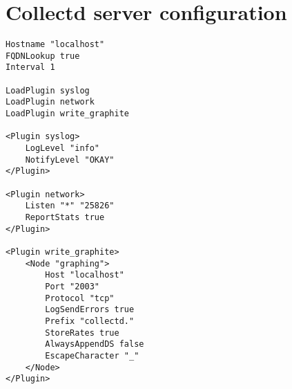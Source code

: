 \section{Collectd server configuration}\label{ANX:collectdFiles2}

\begin{verbatim}
Hostname "localhost"
FQDNLookup true
Interval 1

LoadPlugin syslog
LoadPlugin network
LoadPlugin write_graphite

<Plugin syslog>
	LogLevel "info"
	NotifyLevel "OKAY"
</Plugin>

<Plugin network>
	Listen "*" "25826"
	ReportStats true
</Plugin>

<Plugin write_graphite>
	<Node "graphing">
		Host "localhost"
		Port "2003"
		Protocol "tcp"
		LogSendErrors true
		Prefix "collectd."
		StoreRates true
		AlwaysAppendDS false
		EscapeCharacter "_"
	</Node>
</Plugin>
\end{verbatim}
